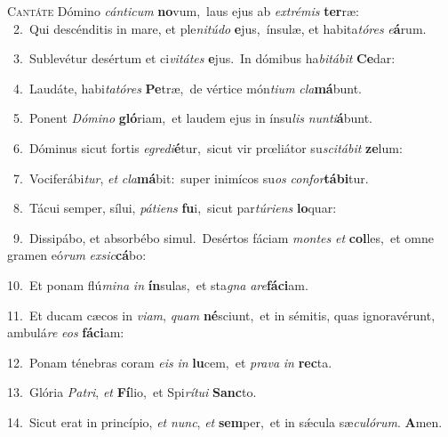 \lettrine{\initial\textcolor{\initialcolor}{C}}{antáte} Dómino \textit{cán}\-\textit{ti}\textit{cum} \textbf{no}\-vum,~\star laus ejus ab \textit{ex}\-\textit{tré}\textit{mis} \textbf{ter}\-ræ:\\
{\numbfont\textcolor{\numbcolor}{~2.}}~Qui descénditis in mare, et ple\-\textit{ni}\-\textit{tú}\textit{do} \textbf{e}\-jus,~\star ínsulæ, et habita\-\textit{tó}\-\textit{res} \textit{e}\-\textbf{á}rum.\par
{\numbfont\textcolor{\numbcolor}{~3.}}~Sublevétur desértum et ci\-\textit{vi}\-\textit{tá}\textit{tes} \textbf{e}\-jus.~\star In dómibus ha\-\textit{bi}\-\textit{tá}\textit{bit} \textbf{Ce}\-dar:\par
{\numbfont\textcolor{\numbcolor}{~4.}}~Laudáte, habi\-\textit{ta}\-\textit{tó}\textit{res} \textbf{Pe}\-træ,~\star de vértice món\-\textit{ti}\-\textit{um} \textit{cla}\-\textbf{má}bunt.\par
{\numbfont\textcolor{\numbcolor}{~5.}}~Ponent \textit{Dó}\-\textit{mi}\textit{no} \textbf{gló}\-riam,~\star et laudem ejus in ínsu\textit{lis} \textit{nun}\-\textit{ti}\textbf{á}bunt.\par
{\numbfont\textcolor{\numbcolor}{~6.}}~Dóminus sicut fortis \textit{e}\-\textit{gre}\textit{di}\textbf{é}tur,~\star sicut vir prœliátor su\-\textit{sci}\-\textit{tá}\textit{bit} \textbf{ze}\-lum:\par
{\numbfont\textcolor{\numbcolor}{~7.}}~Vociferábi\-\textit{tur}\-, \textit{et} \textit{cla}\-\textbf{má}bit:~\star super inimícos su\textit{os} \textit{con}\-\textit{for}\textbf{tá}\textbf{bi}tur.\par
{\numbfont\textcolor{\numbcolor}{~8.}}~Tácui semper, sílui, \textit{pá}\-\textit{ti}\textit{ens} \textbf{fu}\-i,~\star sicut par\-\textit{tú}\-\textit{ri}\textit{ens} \textbf{lo}\-quar:\par
{\numbfont\textcolor{\numbcolor}{~9.}}~Dissipábo, et absorbébo simul.~\dagger Desértos fáciam \textit{mon}\-\textit{tes} \textit{et} \textbf{col}\-les,~\star et omne gramen eó\textit{rum} \textit{ex}\-\textit{sic}\textbf{cá}bo:\par
{\numbfont\textcolor{\numbcolor}{10.}}~Et ponam flú\-\textit{mi}\-\textit{na} \textit{in} \textbf{ín}\-sulas,~\star et sta\textit{gna} \textit{a}\-\textit{re}\textbf{fá}\textbf{ci}am.\par
{\numbfont\textcolor{\numbcolor}{11.}}~Et ducam cæcos in \textit{vi}\-\textit{am}, \textit{quam} \textbf{né}\-sciunt,~\star et in sémitis, quas ignoravérunt, ambulá\textit{re} \textit{e}\-\textit{os} \textbf{fá}\-\textbf{ci}am:\par
{\numbfont\textcolor{\numbcolor}{12.}}~Ponam ténebras coram \textit{e}\-\textit{is} \textit{in} \textbf{lu}\-cem,~\star et \textit{pra}\-\textit{va} \textit{in} \textbf{rec}\-ta.\par
{\numbfont\textcolor{\numbcolor}{13.}}~Glória \textit{Pa}\-\textit{tri}, \textit{et} \textbf{Fí}\-lio,~\star et Spi\-\textit{rí}\-\textit{tu}\textit{i} \textbf{Sanc}\-to.\par
{\numbfont\textcolor{\numbcolor}{14.}}~Sicut erat in princípio, \textit{et} \textit{nunc}\-, \textit{et} \textbf{sem}\-per,~\star et in sǽcula sæ\-\textit{cu}\-\textit{ló}\textit{rum}. \textbf{A}\-men.\par
